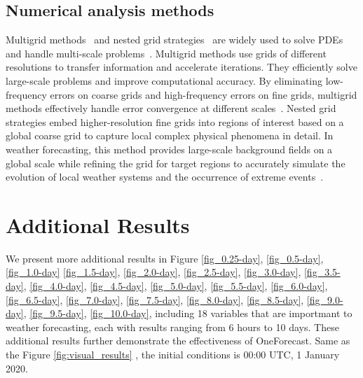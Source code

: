     
\subsection{Numerical analysis methods}
Multigrid methods~\cite{mccormick1987multigrid,wesseling1995introduction,hackbusch2013multi,bramble2019multigrid,hiptmair1998multigrid,brandt1983multigrid,borzi2009multigrid} and nested grid strategies~\cite{miyakoda1977one,zhang2012nested,sullivan1996grid} are widely used to solve PDEs and handle multi-scale problems~\cite{debreu2008two,xue2000advanced}. Multigrid methods use grids of different resolutions to transfer information and accelerate iterations. They efficiently solve large-scale problems and improve computational accuracy. By eliminating low-frequency errors on coarse grids and high-frequency errors on fine grids, multigrid methods effectively handle error convergence at different scales~\cite{he2019mgnet,he2023mgno,shao2022fast}. Nested grid strategies embed higher-resolution fine grids into regions of interest based on a global coarse grid to capture local complex physical phenomena in detail. In weather forecasting, this method provides large-scale background fields on a global scale while refining the grid for target regions to accurately simulate the evolution of local weather systems and the occurrence of extreme events~\cite{bacon2000dynamically}. 


\section{Additional Results}
%
We present more additional results in Figure \ref{fig_0.25-day}, \ref{fig_0.5-day}, \ref{fig_1.0-day} \ref{fig_1.5-day}, \ref{fig_2.0-day}, \ref{fig_2.5-day}, \ref{fig_3.0-day}, \ref{fig_3.5-day}, \ref{fig_4.0-day}, \ref{fig_4.5-day}, \ref{fig_5.0-day}, \ref{fig_5.5-day}, \ref{fig_6.0-day}, \ref{fig_6.5-day}, \ref{fig_7.0-day}, \ref{fig_7.5-day},
\ref{fig_8.0-day}, \ref{fig_8.5-day}, \ref{fig_9.0-day}, \ref{fig_9.5-day},
\ref{fig_10.0-day}, including 18 variables that are importmant to weather forecasting, each with results ranging from 6 hours to 10 days. These additional results further demonstrate the effectiveness of OneForecast. Same as the Figure \ref{fig:visual_results}
, the initial conditions is 00:00 UTC, 1 January 2020.


